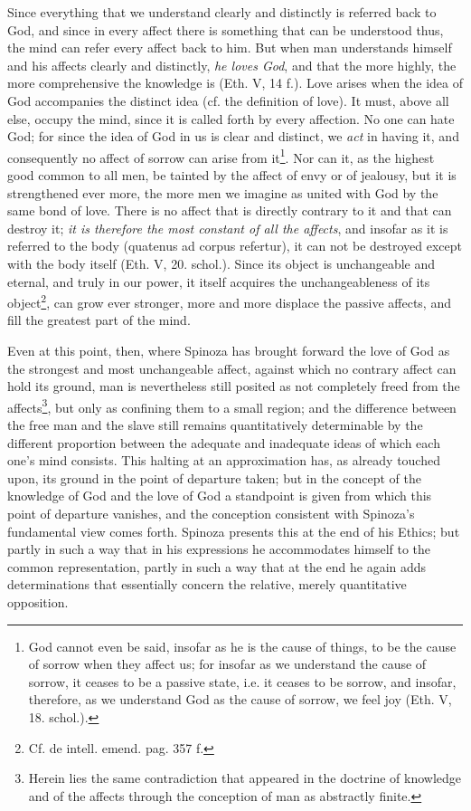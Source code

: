 \documentclass[12pt,a4paper,openany]{book}
\newcommand{\opage}[1]{\marginnote{\footnotesize\textit{[#1]}}}
\begin{document}
Since everything that we understand clearly and distinctly is referred back
to God, and since in every affect there is something that can be understood
thus, the mind can refer every affect back to
him. But when man understands himself and his affects
clearly and distinctly, \emph{he loves God}, and that the
more highly, the more comprehensive the knowledge is (Eth. V,
14 f.). Love arises when the idea of God accompanies
the distinct idea (cf. the definition of love). It
must, above all else, occupy the mind, since it is called forth
by every affection. No one can hate God; for since the idea of God
in us is clear and distinct, we \emph{act} in having
\opage{165}\setcounter{footnote}{0}it, and consequently no affect of sorrow can arise from it\footnote{God cannot even be said, insofar as he is the cause of things, to
be the cause of sorrow when they affect us; for insofar as we understand
the cause of sorrow, it ceases to be a passive state, i.e. it ceases
to be sorrow, and insofar, therefore, as we understand God as the cause of sorrow,
we feel joy (Eth. V, 18. schol.).}. Nor can it, as the highest good
common to all men,
be tainted by the affect of envy or of jealousy,
but it is strengthened ever more, the more men we
imagine as united with God by the same bond
of love. There is no affect that is directly
contrary to it and that can destroy it; \emph{it is therefore the most constant of all the affects},
and insofar as it
is referred to the body (quatenus ad corpus refertur), it can
not be destroyed except with the body itself (Eth. V, 20.
schol.). Since its object is unchangeable and eternal, and
truly in our power, it itself acquires the unchangeableness of its object\footnote{Cf. de intell. emend. pag. 357 f.}, can grow ever stronger, more and more
displace the passive affects, and fill the greatest
part of the mind.

Even at this point, then, where Spinoza has brought
forward the love of God as the strongest and most unchangeable
affect, against which no contrary affect can
hold its ground, man is nevertheless still posited as not completely
freed from the affects\footnote{Herein lies the same contradiction that appeared in the doctrine of
knowledge and of the affects through the conception of man as
abstractly finite.}, but only as confining
them to a small region; and the difference between the free man
and the slave still remains quantitatively determinable by the
different proportion between the adequate and inadequate ideas
of which each one's mind consists. This halting at an approximation
has, as already touched upon, its ground in the point of departure
taken; but in the concept of the knowledge of God and
the love of God a standpoint is given from which
this point of departure vanishes, and the conception consistent with Spinoza's
\opage{166}\setcounter{footnote}{0}fundamental view comes forth. Spinoza
presents this at the end of his Ethics; but partly
in such a way that in his expressions he accommodates himself to the common
representation, partly in such a way that at the end
he again adds determinations that essentially concern the relative,
merely quantitative opposition.
\end{document}
